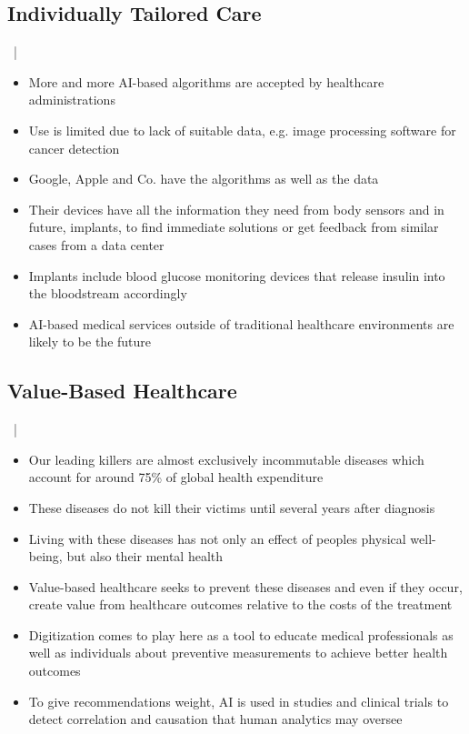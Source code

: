 \documentclass[xcolor=dvipsnames, aspectratio=1610]{beamer}
\begin{document}
\subsection{Individually Tailored Care}%
\label{sub:individually_tailored_care}

\begin{frame}{\secname\ | \subsecname}
    \begin{itemize}[<+->]
        \item More and more AI-based algorithms are accepted by healthcare administrations \cite{fdaAi}
        \item Use is limited due to lack of suitable data, e.g. image processing software for cancer detection \cite{kiKroenung}
        \item Google, Apple and Co. have the algorithms as well as the data
        \item Their devices have all the information they need from body sensors and in future, implants, to find immediate solutions or get feedback from similar cases from a data center \cite{kiKroenung}
        \item Implants include blood glucose monitoring devices that release insulin into the bloodstream accordingly \cite{rege2017development}
        \item AI-based medical services outside of traditional healthcare environments are likely to be the future
    \end{itemize}
\end{frame}

\subsection{Value-Based Healthcare}%
\label{sub:value_based_healthcare}

\begin{frame}{\secname\ | \subsecname}
    \begin{itemize}[<+->]
        \item Our leading killers are almost exclusively incommutable diseases which account for around 75\% of global health expenditure \cite{tsiachristas2016financial}
        \item These diseases do not kill their victims until several years after diagnosis
        \item Living with these diseases has not only an effect of peoples physical well-being, but also their mental health
        \item Value-based healthcare seeks to prevent these diseases and even if they occur, create value from healthcare outcomes relative to the costs of the treatment \cite{putera2017redefining}
        \item Digitization comes to play here as a tool to educate medical professionals as well as individuals about preventive measurements to achieve better health outcomes
        \item To give recommendations weight, AI is used in studies and clinical trials to detect correlation and causation that human analytics may oversee \cite{rehme2014identifying}
    \end{itemize}
\end{frame}
\end{document}
